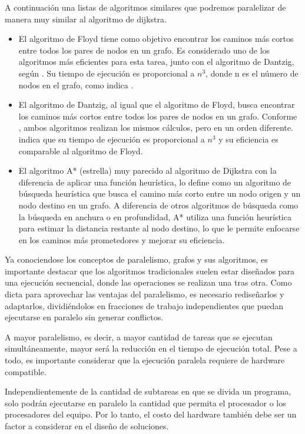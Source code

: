 A continuación una listas de algoritmos similares que podremos paralelizar de manera muy similar al algoritmo de dijkstra.

\begin{itemize}
  \item El algoritmo de Floyd tiene como objetivo encontrar los caminos más cortos entre todos los pares de nodos en un grafo. Es considerado uno de los algoritmos más eficientes para esta tarea, junto con el algoritmo de Dantzig, según \cite{Dreyfus}. Su tiempo de ejecución es proporcional a \( n^3 \), donde n es el número de nodos en el grafo, como indica \cite{deo}.
  \item El algoritmo de Dantzig, al igual que el algoritmo de Floyd, busca encontrar los caminos más cortos entre todos los pares de nodos en un grafo. Conforme \cite{Minieka}, ambos algoritmos realizan los mismos cálculos, pero en un orden diferente. \cite{deo} indica que su tiempo de ejecución es proporcional a \( n^3 \) y su eficiencia es comparable al algoritmo de Floyd. 
  \item El algoritmo A* (estrella) muy parecido al algoritmo de Dijkstra con la diferencia de aplicar una función heurística, \cite{Dreyfus} lo define como un algoritmo de búsqueda heurística que busca el camino más corto entre un nodo origen y un nodo destino en un grafo. A diferencia de otros algoritmos de búsqueda como la búsqueda en anchura o en profundidad, A* utiliza una función heurística para estimar la distancia restante al nodo destino, lo que le permite enfocarse en los caminos más prometedores y mejorar su eficiencia.
\end{itemize}

Ya conociendose los conceptos de paralelismo, grafos y sus algoritmos, es importante destacar que los algoritmos tradicionales suelen estar diseñados para una ejecución secuencial, donde las operaciones se realizan una tras otra. Como dicta \cite{Stallings} para aprovechar las ventajas del paralelismo, es necesario rediseñarlos y adaptarlos, dividiéndolos en fracciones de trabajo independientes que puedan ejecutarse en paralelo sin generar conflictos.

A mayor paralelismo, es decir, a mayor cantidad de tareas que se ejecutan simultáneamente, mayor será la reducción en el tiempo de ejecución total. Pese a todo, es importante considerar que la ejecución paralela requiere de hardware compatible.

Independientemente de la cantidad de subtareas en que se divida un programa, solo podrán ejecutarse en paralelo la cantidad que permita el procesador o los procesadores del equipo. Por lo tanto, el costo del hardware también debe ser un factor a considerar en el diseño de soluciones.

